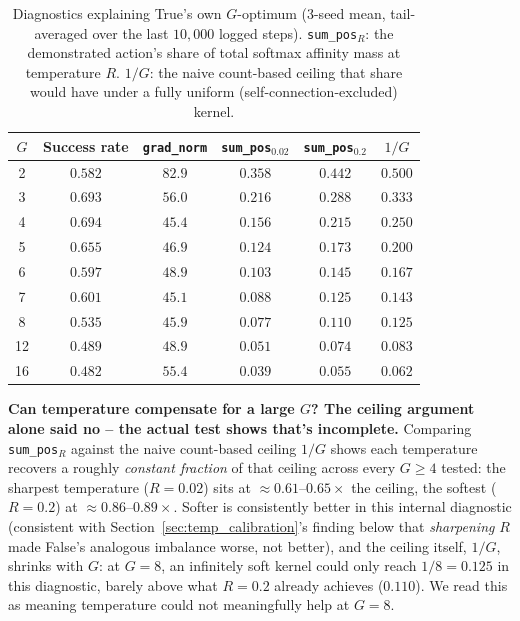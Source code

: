 \documentclass[11pt]{article}
\begin{document}
\begin{table}[H]
\centering
\caption{Diagnostics explaining True's own $G$-optimum (3-seed mean,
tail-averaged over the last $10{,}000$ logged steps).
\texttt{sum\_pos}$_R$: the demonstrated action's share of total softmax
affinity mass at temperature $R$. $1/G$: the naive count-based ceiling
that share would have under a fully uniform (self-connection-excluded)
kernel.}
\label{tab:drift_true_mechanism}
\begin{tabular}{cccccc}
\toprule
$G$ & Success rate & \texttt{grad\_norm} & \texttt{sum\_pos}$_{0.02}$ & \texttt{sum\_pos}$_{0.2}$ & $1/G$ \\
\midrule
2  & $0.582$ & $82.9$ & $0.358$ & $0.442$ & $0.500$ \\
3  & $0.693$ & $56.0$ & $0.216$ & $0.288$ & $0.333$ \\
4  & $0.694$ & $45.4$ & $0.156$ & $0.215$ & $0.250$ \\
5  & $0.655$ & $46.9$ & $0.124$ & $0.173$ & $0.200$ \\
6  & $0.597$ & $48.9$ & $0.103$ & $0.145$ & $0.167$ \\
7  & $0.601$ & $45.1$ & $0.088$ & $0.125$ & $0.143$ \\
8  & $0.535$ & $45.9$ & $0.077$ & $0.110$ & $0.125$ \\
12 & $0.489$ & $48.9$ & $0.051$ & $0.074$ & $0.083$ \\
16 & $0.482$ & $55.4$ & $0.039$ & $0.055$ & $0.062$ \\
\bottomrule
\end{tabular}
\end{table}

\textbf{Can temperature compensate for a large $G$? The ceiling argument
alone said no -- the actual test shows that's incomplete.} Comparing
\texttt{sum\_pos}$_R$ against the naive count-based ceiling $1/G$ shows
each temperature recovers a roughly \emph{constant fraction} of that
ceiling across every $G\ge4$ tested: the sharpest temperature
($R=0.02$) sits at $\approx0.61$--$0.65\times$ the ceiling, the softest
($R=0.2$) at $\approx0.86$--$0.89\times$. Softer is consistently better
in this internal diagnostic (consistent with Section~\ref{sec:temp_calibration}'s
finding below that \emph{sharpening} $R$ made False's analogous
imbalance worse, not better), and the ceiling itself, $1/G$, shrinks
with $G$: at $G=8$, an infinitely soft kernel could only reach
$1/8=0.125$ in this diagnostic, barely above what $R=0.2$ already
achieves ($0.110$). We read this as meaning temperature could not
meaningfully help at $G=8$.
\end{document}
